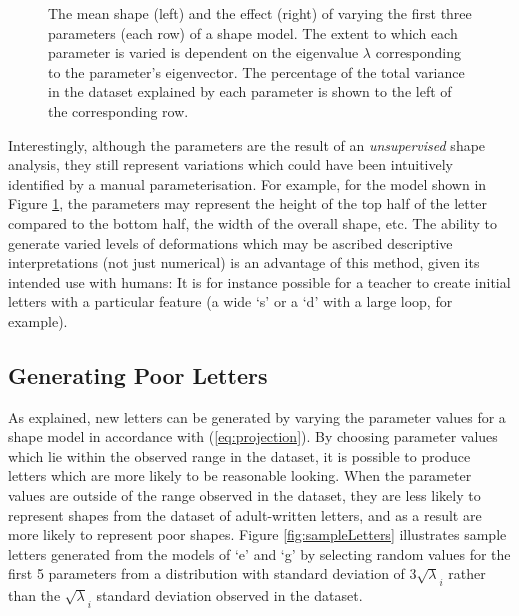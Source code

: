 \documentclass{sig-alternate}
\begin{document}
\begin{figure}[thpb]
\centering
{}
\caption[The mean shape and the effect of varying the first three parameters of
the shape model derived from PCA from the dataset of print `s'
shapes.]{\label{fig:deviations_sPrint}The mean shape (left) and the effect
    (right) of varying the first three parameters (each row) of a shape model.
     The extent to which each
parameter is varied is dependent on the eigenvalue $\lambda$ corresponding to
the parameter's eigenvector. The percentage of the total variance in the dataset
explained by each parameter is shown to the left of the corresponding row. }

\end{figure}



Interestingly, although the parameters are the result of an \emph{unsupervised} 
shape analysis, they still represent variations which could have
been intuitively identified by a manual parameterisation. For example, for the
model shown in Figure \ref{fig:deviations_sPrint}, the parameters may represent
the height of the top half of the letter compared to the bottom half, the width
of the overall shape, etc. The ability to generate varied levels of deformations
which may be ascribed descriptive interpretations (not just numerical) is an
advantage of this method, given its intended use with humans: It is for instance
possible for a teacher to create initial letters with a particular feature (a wide
`s' or a `d' with a large loop, for example).


\subsection{Generating Poor Letters}

As explained, new letters can be generated by varying the parameter values 
for a shape model in accordance with (\ref{eq:projection}). By choosing
parameter values which lie within the observed range in the dataset, it is
possible to produce letters which are more likely to be reasonable looking.
When the parameter values are outside of the range observed in the dataset, they
are less likely to represent shapes from the dataset of adult-written letters, 
and as a result are more likely to represent poor shapes.
Figure \ref{fig:sampleLetters} illustrates sample letters generated from the
models of `e' and `g' by selecting random values for the first 5 parameters 
from a distribution with
standard deviation of $3\sqrt\lambda_i$ rather than the $\sqrt\lambda_i$
standard deviation observed in the dataset.
\end{document}
